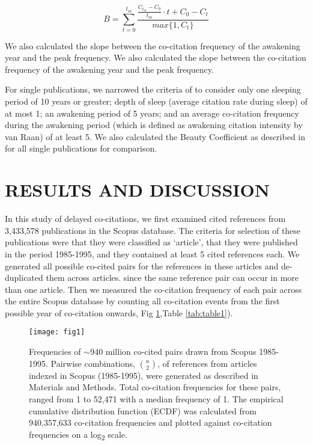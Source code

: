 \documentclass[utf8]{frontiersSCNS}
\begin{document}
$$ B=  \sum_{t=0}^{t_m} \frac {\frac{C_{t_m} - C_0}{t_m} \cdot t + C_0 - C_t} {max\{1,C_t\}} $$


We  also calculated the slope between the co-citation frequency of the awakening year and the peak frequency. We  also calculated the slope between the co-citation frequency of the awakening year and the peak frequency.

For single publications, we narrowed the criteria of \cite{Raan2019} to consider only one sleeping period of 10 years or greater; depth of sleep (average citation rate during sleep) of at most 1; an awakening period of 5 years; and an average co-citation frequency during the awakening period (which is defined as awakening citation intensity by van Raan) of at least 5. We also calculated the Beauty Coefficient as described in \cite{Ke2015} for all single publications for comparison.

\section{RESULTS AND DISCUSSION}

In this study of delayed co-citations, we first examined cited references from 3,433,578 publications in the Scopus database. The criteria for selection of these publications were that they were classified as `article', that they were published in the period 1985-1995, and they contained at least 5 cited references each. We generated all possible co-cited pairs for the references in these articles and de-duplicated them across articles. since the same reference pair can occur in more than one article. Then we measured the co-citation frequency of each pair across the entire Scopus database by counting all co-citation events from the first possible year of co-citation onwards, Fig \ref{fig:fig1},Table \ref{tab:table1}).

\begin{figure}[h!]
\begin{center}
\texttt{[image: fig1]}%
\end{center}
\caption{Frequencies of $\sim$940 million co-cited pairs drawn from Scopus 1985-1995. Pairwise combinations, $n\choose 2$, of references from articles indexed in Scopus (1985-1995), were generated as described in Materials and Methods. Total co-citation frequencies for these pairs, ranged from 1 to 52,471 with a median frequency of 1. The empirical cumulative distribution function (ECDF) was calculated from 940,357,633 co-citation frequencies and plotted against co-citation frequencies on a log\textsubscript{2} scale.}
\label{fig:fig1}
\end{figure}
\end{document}
